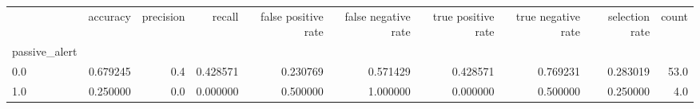 \begin{tabular}{lrrrrrrrrr}
\toprule
{} &  accuracy &  precision &    recall &  false positive rate &  false negative rate &  true positive rate &  true negative rate &  selection rate &  count \\
passive\_alert &           &            &           &                      &                      &                     &                     &                 &        \\
\midrule
0.0           &  0.679245 &        0.4 &  0.428571 &             0.230769 &             0.571429 &            0.428571 &            0.769231 &        0.283019 &   53.0 \\
1.0           &  0.250000 &        0.0 &  0.000000 &             0.500000 &             1.000000 &            0.000000 &            0.500000 &        0.250000 &    4.0 \\
\bottomrule
\end{tabular}
